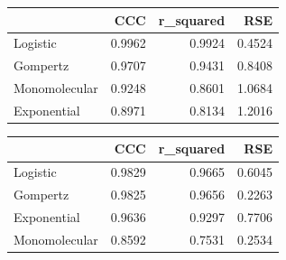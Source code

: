 \documentclass[
  letterpaper,
]{book}
\newenvironment{Shaded}{\begin{snugshade}}{\end{snugshade}}
\newcommand{\AttributeTok}[1]{\textcolor[rgb]{0.40,0.45,0.13}{#1}}
\newcommand{\FunctionTok}[1]{\textcolor[rgb]{0.28,0.35,0.67}{#1}}
\newcommand{\NormalTok}[1]{\textcolor[rgb]{0.00,0.23,0.31}{#1}}
\newcommand{\OtherTok}[1]{\textcolor[rgb]{0.00,0.23,0.31}{#1}}
\newcommand{\SpecialCharTok}[1]{\textcolor[rgb]{0.37,0.37,0.37}{#1}}
\newcommand{\StringTok}[1]{\textcolor[rgb]{0.13,0.47,0.30}{#1}}
\begin{document}
\begin{Shaded}
\end{Shaded}

\begin{longtable}[]{@{}lrrr@{}}
\toprule\noalign{}
& CCC & r\_squared & RSE \\
\midrule\noalign{}
\endhead
\bottomrule\noalign{}
\endlastfoot
Logistic & 0.9962 & 0.9924 & 0.4524 \\
Gompertz & 0.9707 & 0.9431 & 0.8408 \\
Monomolecular & 0.9248 & 0.8601 & 1.0684 \\
Exponential & 0.8971 & 0.8134 & 1.2016 \\
\end{longtable}

\begin{Shaded}
\end{Shaded}

\begin{longtable}[]{@{}lrrr@{}}
\toprule\noalign{}
& CCC & r\_squared & RSE \\
\midrule\noalign{}
\endhead
\bottomrule\noalign{}
\endlastfoot
Logistic & 0.9829 & 0.9665 & 0.6045 \\
Gompertz & 0.9825 & 0.9656 & 0.2263 \\
Exponential & 0.9636 & 0.9297 & 0.7706 \\
Monomolecular & 0.8592 & 0.7531 & 0.2534 \\
\end{longtable}
\end{document}
